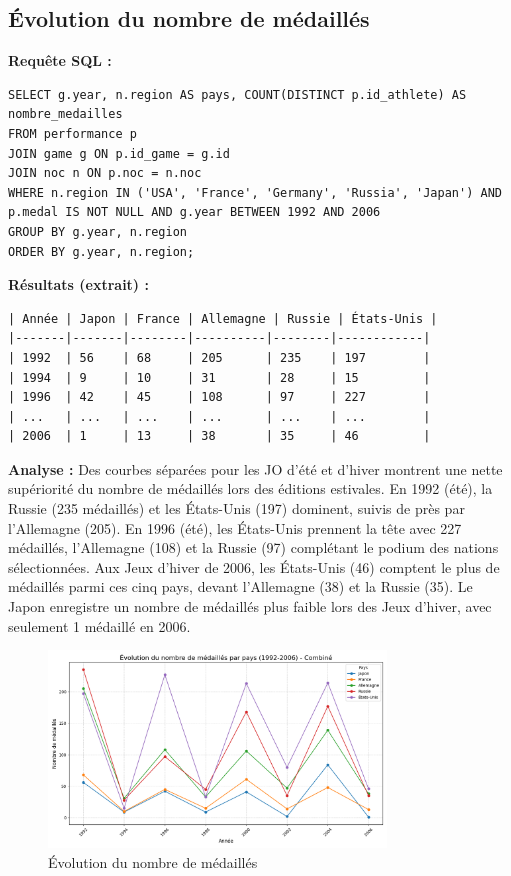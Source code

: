\documentclass[fontsize=10pt,oneside]{scrreprt}
\begin{document}
\subsection{Évolution du nombre de médaillés}
\textbf{Requête SQL :}
\begin{verbatim}
SELECT g.year, n.region AS pays, COUNT(DISTINCT p.id_athlete) AS nombre_medailles
FROM performance p
JOIN game g ON p.id_game = g.id
JOIN noc n ON p.noc = n.noc
WHERE n.region IN ('USA', 'France', 'Germany', 'Russia', 'Japan') AND p.medal IS NOT NULL AND g.year BETWEEN 1992 AND 2006
GROUP BY g.year, n.region
ORDER BY g.year, n.region;
\end{verbatim}
\textbf{Résultats (extrait) :}
\begin{verbatim}
| Année | Japon | France | Allemagne | Russie | États-Unis |
|-------|-------|--------|----------|--------|------------|
| 1992  | 56    | 68     | 205      | 235    | 197        |
| 1994  | 9     | 10     | 31       | 28     | 15         |
| 1996  | 42    | 45     | 108      | 97     | 227        |
| ...   | ...   | ...    | ...      | ...    | ...        |
| 2006  | 1     | 13     | 38       | 35     | 46         |
\end{verbatim}
\textbf{Analyse :} Des courbes séparées pour les JO d'été et d'hiver montrent une nette supériorité du nombre de médaillés lors des éditions estivales. En 1992 (été), la Russie (235 médaillés) et les États-Unis (197) dominent, suivis de près par l'Allemagne (205). En 1996 (été), les États-Unis prennent la tête avec 227 médaillés, l'Allemagne (108) et la Russie (97) complétant le podium des nations sélectionnées. Aux Jeux d'hiver de 2006, les États-Unis (46) comptent le plus de médaillés parmi ces cinq pays, devant l'Allemagne (38) et la Russie (35). Le Japon enregistre un nombre de médaillés plus faible lors des Jeux d'hiver, avec seulement 1 médaillé en 2006.
\begin{figure}[H]
    \centering
    \includegraphics[width=0.8\textwidth]{charts/3bii.png}
    \caption{Évolution du nombre de médaillés}
    \label{fig:evol_medailles}
\end{figure}
\end{document}
